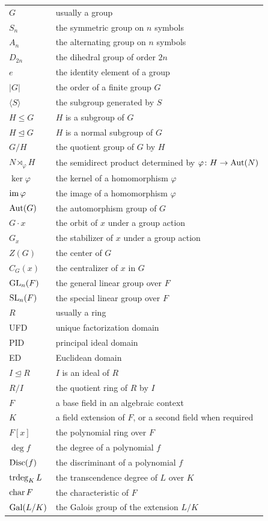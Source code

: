 {\begin{longtable}{@{}L{0.27\textwidth}L{0.65\textwidth}@{}}
        $G$ & usually a group \\
        $S_n$ & the symmetric group on $n$ symbols \\
        $A_n$ & the alternating group on $n$ symbols \\
        $D_{2n}$ & the dihedral group of order $2n$ \\
        $e$ & the identity element of a group \\
        $|G|$ & the order of a finite group $G$ \\
        $\langle S\rangle$ & the subgroup generated by $S$ \\
        $H\leq G$ & $H$ is a subgroup of $G$ \\
        $H\trianglelefteq G$ & $H$ is a normal subgroup of $G$ \\
        $G/H$ & the quotient group of $G$ by $H$ \\
        $N\rtimes_\varphi H$ & the semidirect product determined by $\varphi\colon H\to\operatorname{Aut}(N)$ \\
        $\ker\varphi$ & the kernel of a homomorphism $\varphi$ \\
        $\operatorname{im}\varphi$ & the image of a homomorphism $\varphi$ \\
        $\operatorname{Aut}(G)$ & the automorphism group of $G$ \\
        $G\cdot x$ & the orbit of $x$ under a group action \\
        $G_x$ & the stabilizer of $x$ under a group action \\
        $Z(G)$ & the center of $G$ \\
        $C_G(x)$ & the centralizer of $x$ in $G$ \\
        $\operatorname{GL}_n(F)$ & the general linear group over $F$ \\
        $\operatorname{SL}_n(F)$ & the special linear group over $F$ \\
        $R$ & usually a ring \\
        UFD & unique factorization domain \\
        PID & principal ideal domain \\
        ED & Euclidean domain \\
        $I\trianglelefteq R$ & $I$ is an ideal of $R$ \\
        $R/I$ & the quotient ring of $R$ by $I$ \\
        $F$ & a base field in an algebraic context \\
        $K$ & a field extension of $F$, or a second field when required \\
        $F[x]$ & the polynomial ring over $F$ \\
        $\deg f$ & the degree of a polynomial $f$ \\
        $\operatorname{Disc}(f)$ & the discriminant of a polynomial $f$ \\
        $\operatorname{trdeg}_K L$ & the transcendence degree of $L$ over $K$ \\
        $\operatorname{char} F$ & the characteristic of $F$ \\
        $\operatorname{Gal}(L/K)$ & the Galois group of the extension $L/K$ \\
    \end{longtable}
    }

